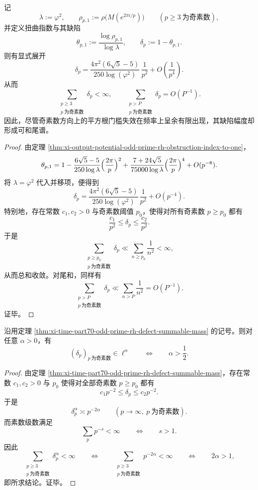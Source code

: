 \begin{theorem}\label{thm:xi-time-part70-odd-prime-rh-defect-summable-mass}
记
\[
\lambda:=\varphi^2,
\qquad
\rho_{p,1}:=\rho\!\bigl(M(e^{2\pi i/p})\bigr)
\qquad
(p\ge 3\ \text{为奇素数}),
\]
并定义扭曲指数与其缺陷
\[
\theta_{p,1}:=\frac{\log \rho_{p,1}}{\log\lambda},
\qquad
\delta_p:=1-\theta_{p,1}.
\]
则有显式展开
\[
\delta_p
=
\frac{4\pi^2(6\sqrt5-5)}{250\log(\varphi^2)}\,\frac{1}{p^2}
+O\!\left(\frac{1}{p^4}\right).
\]
从而
\[
\sum_{\substack{p\ge 3\\ p\ \text{为奇素数}}}\delta_p<\infty,
\qquad
\sum_{\substack{p>P\\ p\ \text{为奇素数}}}\delta_p=O(P^{-1}).
\]
因此，尽管奇素数方向上的平方根门槛失效在频率上呈余有限出现，其缺陷幅度却形成可和尾谱。
\end{theorem}
\begin{proof}
由定理 \ref{thm:xi-output-potential-odd-prime-rh-obstruction-index-to-one}，
\[
\theta_{p,1}
=
1-\frac{6\sqrt5-5}{250\log\lambda}\Bigl(\frac{2\pi}{p}\Bigr)^2
+\frac{7+24\sqrt5}{75000\log\lambda}\Bigl(\frac{2\pi}{p}\Bigr)^4
+O(p^{-6}).
\]
将 \(\lambda=\varphi^2\) 代入并移项，便得到
\[
\delta_p
=
\frac{4\pi^2(6\sqrt5-5)}{250\log(\varphi^2)}\,\frac{1}{p^2}
+O(p^{-4}).
\]
特别地，存在常数 \(c_1,c_2>0\) 与奇素数阈值 \(p_0\)，使得对所有奇素数 \(p\ge p_0\) 都有
\[
\frac{c_1}{p^2}\le \delta_p\le \frac{c_2}{p^2}.
\]
于是
\[
\sum_{\substack{p\ge p_0\\ p\ \text{为奇素数}}}\delta_p
\ll
\sum_{n\ge p_0}\frac{1}{n^2}
<\infty,
\]
从而总和收敛。对尾和，同样有
\[
\sum_{\substack{p>P\\ p\ \text{为奇素数}}}\delta_p
\ll
\sum_{n>P}\frac{1}{n^2}
=
O(P^{-1}).
\]
证毕。
\end{proof}

\begin{corollary}\label{cor:xi-time-part70-odd-prime-rh-defect-ell-alpha-threshold}
沿用定理 \ref{thm:xi-time-part70-odd-prime-rh-defect-summable-mass} 的记号。则对任意 \(\alpha>0\)，有
\[
(\delta_p)_{p\ \text{为奇素数}}\in \ell^\alpha
\qquad\Longleftrightarrow\qquad
\alpha>\frac12.
\]
\end{corollary}
\begin{proof}
由定理 \ref{thm:xi-time-part70-odd-prime-rh-defect-summable-mass}，存在常数 \(c_1,c_2>0\) 与 \(p_0\) 使得对全部奇素数 \(p\ge p_0\) 都有
\[
c_1p^{-2}\le \delta_p\le c_2p^{-2}.
\]
于是
\[
\delta_p^\alpha\asymp p^{-2\alpha}
\qquad (p\to\infty,\ p\ \text{为奇素数}).
\]
而素数级数满足
\[
\sum_{p}p^{-s}<\infty
\qquad\Longleftrightarrow\qquad
s>1.
\]
因此
\[
\sum_{\substack{p\ge 3\\ p\ \text{为奇素数}}}\delta_p^\alpha<\infty
\qquad\Longleftrightarrow\qquad
\sum_{\substack{p\ge 3\\ p\ \text{为奇素数}}}p^{-2\alpha}<\infty
\qquad\Longleftrightarrow\qquad
2\alpha>1,
\]
即所求结论。证毕。
\end{proof}

